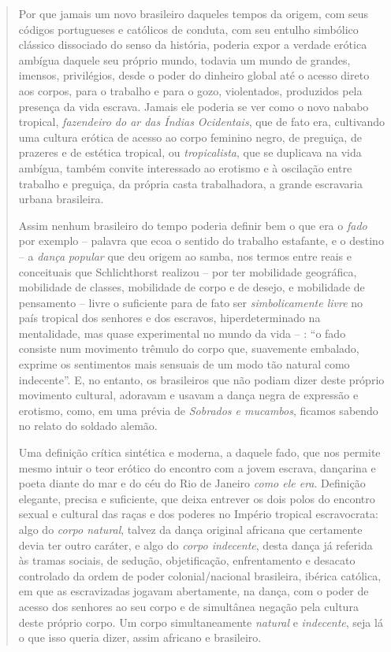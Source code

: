 \begin{quote}
Por que jamais um novo brasileiro daqueles tempos da origem, com seus
códigos portugueses e católicos de conduta, com seu entulho simbólico
clássico dissociado do senso da história, poderia expor a verdade
erótica ambígua daquele seu próprio mundo, todavia um mundo de grandes,
imensos, privilégios, desde o poder do dinheiro global até o acesso
direto aos corpos, para o trabalho e para o gozo, violentados,
produzidos pela presença da vida escrava. Jamais ele poderia se ver como
o novo nababo tropical, \emph{fazendeiro do ar das Índias Ocidentais},
que de fato era, cultivando uma cultura erótica de acesso ao corpo
feminino negro, de preguiça, de prazeres e de estética tropical, ou
\emph{tropicalista}, que se duplicava na vida ambígua, também convite
interessado ao erotismo e à oscilação entre trabalho e preguiça, da
própria casta trabalhadora, a grande escravaria urbana brasileira.

Assim nenhum brasileiro do tempo poderia definir bem o que era o
\emph{fado} por exemplo -- palavra que ecoa o sentido do trabalho
estafante, e o destino -- a \emph{dança} \emph{popular} que deu origem
ao samba, nos termos entre reais e conceituais que Schlichthorst
realizou -- por ter mobilidade geográfica, mobilidade de classes,
mobilidade de corpo e de desejo, e mobilidade de pensamento -- livre o
suficiente para de fato ser \emph{simbolicamente livre} no país tropical
dos senhores e dos escravos, hiperdeterminado na mentalidade, mas quase
experimental no mundo da vida -- : ``o fado consiste num movimento
trêmulo do corpo que, suavemente embalado, exprime os sentimentos mais
sensuais de um modo tão natural como indecente''. E, no entanto, os
brasileiros que não podiam dizer deste próprio movimento cultural,
adoravam e usavam a dança negra de expressão e erotismo, como, em uma
prévia de \emph{Sobrados e mucambos}, ficamos sabendo no relato do
soldado alemão.

Uma definição crítica sintética e moderna, a daquele fado, que nos
permite mesmo intuir o teor erótico do encontro com a jovem escrava,
dançarina e poeta diante do mar e do céu do Rio de Janeiro \emph{como
ele era}. Definição elegante, precisa e suficiente, que deixa entrever
os dois polos do encontro sexual e cultural das raças e dos poderes no
Império tropical escravocrata: algo do \emph{corpo natural}, talvez da
dança original africana que certamente devia ter outro caráter, e algo
do \emph{corpo indecente}, desta dança já referida às tramas sociais, de
sedução, objetificação, enfrentamento e desacato controlado da ordem de
poder colonial/nacional brasileira, ibérica católica, em que as
escravizadas jogavam abertamente, na dança, com o poder de acesso dos
senhores ao seu corpo e de simultânea negação pela cultura deste próprio
corpo. Um corpo simultaneamente \emph{natural} e \emph{indecente}, seja
lá o que isso queria dizer, assim africano e brasileiro.


\end{quote}
